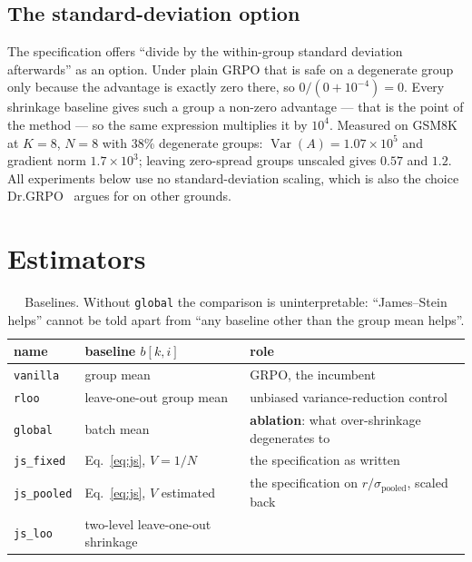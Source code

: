 \documentclass{article}
\newcommand{\Var}{\operatorname{Var}}
\newcommand{\arm}[1]{\texttt{#1}}
\begin{document}
\subsection{The standard-deviation option}
\label{sec:footgun}

The specification offers ``divide by the within-group standard deviation
afterwards'' as an option. Under plain GRPO that is safe on a degenerate
group only because the advantage is exactly zero there, so
$0/(0+10^{-4})=0$. Every shrinkage baseline gives such a group a non-zero
advantage --- that is the point of the method --- so the same expression
multiplies it by $10^4$. Measured on GSM8K at $K=8$, $N=8$ with 38\%
degenerate groups: $\Var(A)=1.07\times10^5$ and gradient norm
$1.7\times10^3$; leaving zero-spread groups unscaled gives $0.57$ and
$1.2$. All experiments below use no standard-deviation scaling, which is
also the choice Dr.GRPO~\citep{liu2025drgrpo} argues for on other grounds.

\section{Estimators}
\label{sec:estimators}

\begin{table}[t]\centering\small
\begin{tabular}{llp{6.4cm}}
\toprule
name & baseline $b[k,i]$ & role \\
\midrule
\arm{vanilla}   & group mean                         & GRPO, the incumbent \\
\arm{rloo}      & leave-one-out group mean           & unbiased variance-reduction control \\
\arm{global}    & batch mean                         & \textbf{ablation}: what over-shrinkage degenerates to \\
\arm{js\_fixed} & Eq.~\eqref{eq:js}, $V=1/N$         & the specification as written \\
\arm{js\_pooled}& Eq.~\eqref{eq:js}, $V$ estimated   & the specification on $r/\sigma_{\text{pooled}}$, scaled back \\
\arm{js\_loo}   & two-level leave-one-out shrinkage  & \citet{zeng2025shrinking} \\
\bottomrule
\end{tabular}
\caption{Baselines. Without \arm{global} the comparison is uninterpretable:
``James--Stein helps'' cannot be told apart from ``any baseline other than
the group mean helps''.}
\label{tab:arms}
\end{table}
\end{document}
